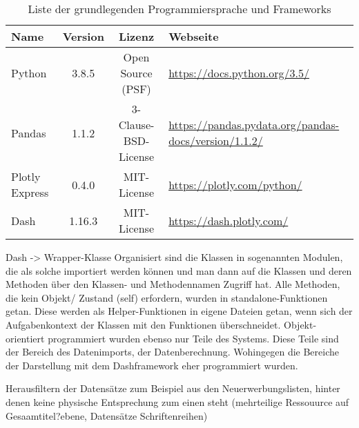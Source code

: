 \begingroup
\setlength{\tabcolsep}{4pt} %
\renewcommand{\arraystretch}{1.5}
\begin{table}[h]
    \centering
    \begin{adjustbox}{max width=\textwidth}
    \Huge
    \begin{tabular}{lccl}
       \toprule
       \textbf{Name}             &{Version}    &\textbf{Lizenz}                        & \textbf{Webseite}\\
       \midrule     
            Python               &3.8.5         &Open Source (PSF)                     & \url{https://docs.python.org/3.5/}\\
            Pandas               &1.1.2         &3-Clause-BSD-License                  & \url{https://pandas.pydata.org/pandas-docs/version/1.1.2/}\\
            Plotly Express       &0.4.0         &MIT-License                           & \url{https://plotly.com/python/}\\
            Dash                 &1.16.3        &MIT-License                           & \url{https://dash.plotly.com/}\\
            

        \bottomrule
    \end{tabular}
    \end{adjustbox}
    \caption{%
        Liste der grundlegenden Programmiersprache und Frameworks
    \label{tab:Software-Requirements}
    }
     \end{table}
\endgroup



Dash -> 
Wrapper-Klasse 
Organisiert sind die Klassen in sogenannten Modulen, die als solche importiert werden können und man dann auf die Klassen und deren Methoden 
über den Klassen- und Methodennamen Zugriff hat.
Alle Methoden, die kein Objekt/ Zustand (self) erfordern, wurden in standalone-Funktionen getan. Diese werden als Helper-Funktionen in eigene Dateien getan,
wenn sich der Aufgabenkontext der Klassen mit den Funktionen überschneidet.
Objekt-orientiert programmiert wurden ebenso nur Teile des Systems. Diese Teile sind der Bereich des Datenimports, der Datenberechnung. Wohingegen die Bereiche der Darstellung mit dem Dashframework eher programmiert wurden. 

Herausfiltern der Datensätze zum Beispiel aus den Neuerwerbungslisten, hinter denen keine physische Entsprechung zum einen steht (mehrteilige Ressouurce auf Gesaamtitel?ebene, Datensätze Schriftenreihen)

